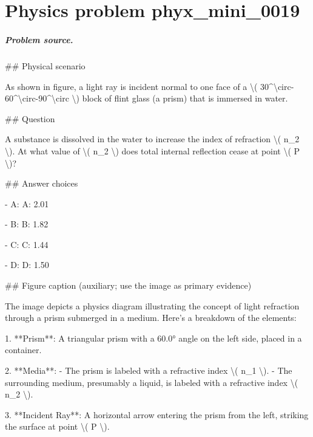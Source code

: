 
\chapter{Physics problem phyx\_mini\_0019}
\label{ch:PhyXMiniProblems_problem_phyx_mini_0019}

\paragraph{Problem source.}
\#\# Physical scenario

As shown in figure, a light ray is incident normal to one face of a \textbackslash{}( 30\textasciicircum{}\textbackslash{}circ-60\textasciicircum{}\textbackslash{}circ-90\textasciicircum{}\textbackslash{}circ \textbackslash{}) block of flint glass (a prism) that is immersed in water.

\#\# Question

A substance is dissolved in the water to increase the index of refraction \textbackslash{}( n\_2 \textbackslash{}). At what value of \textbackslash{}( n\_2 \textbackslash{}) does total internal reflection cease at point \textbackslash{}( P \textbackslash{})?

\#\# Answer choices

- A: A: 2.01

- B: B: 1.82

- C: C: 1.44

- D: D: 1.50

\#\# Figure caption (auxiliary; use the image as primary evidence)

The image depicts a physics diagram illustrating the concept of light refraction through a prism submerged in a medium. Here's a breakdown of the elements:

1. **Prism**: A triangular prism with a 60.0° angle on the left side, placed in a container.

2. **Media**: 
   - The prism is labeled with a refractive index \textbackslash{}( n\_1 \textbackslash{}).
   - The surrounding medium, presumably a liquid, is labeled with a refractive index \textbackslash{}( n\_2 \textbackslash{}).

3. **Incident Ray**: A horizontal arrow entering the prism from the left, striking the surface at point \textbackslash{}( P \textbackslash{}).

